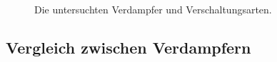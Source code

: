 \begin{figure}[h!tb]
\caption{Die untersuchten Verdampfer und Verschaltungsarten.}
\label{fig:Verschaltungsarten}
\end{figure}




\subsection{Vergleich zwischen Verdampfern}
\label{subsec:Vergleich zwischen Verdampfern}

